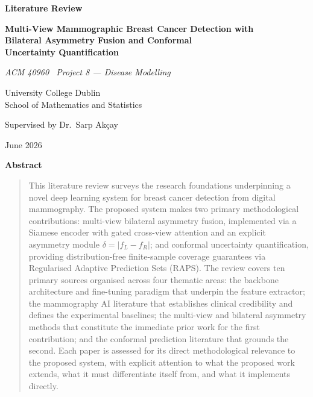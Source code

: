 \documentclass[12pt, a4paper]{article}
\renewenvironment{abstract}{%
  \begin{center}\textbf{Abstract}\end{center}%
  \begin{quotation}%
}{\end{quotation}}
\begin{document}
\begin{titlepage}
  \centering
  \vspace*{3cm}

  {\LARGE\bfseries Literature Review\par}
  \vspace{1.2cm}

  {\large\bfseries
    Multi-View Mammographic Breast Cancer Detection with\\
    Bilateral Asymmetry Fusion and Conformal\\
    Uncertainty Quantification\par}
  \vspace{1.8cm}

  {\normalsize\itshape ACM 40960 \textperiodcentered\ Project 8 --- Disease Modelling\par}
  \vspace{0.6cm}

  {\normalsize University College Dublin\\
  School of Mathematics and Statistics\par}
  \vspace{0.6cm}

  {\normalsize Supervised by Dr.\ Sarp Ak{\c{c}}ay\par}
  \vspace{0.6cm}

  {\normalsize June 2026\par}
\end{titlepage}

\begin{abstract}
This literature review surveys the research foundations underpinning a novel
deep learning system for breast cancer detection from digital mammography.
The proposed system makes two primary methodological contributions: multi-view
bilateral asymmetry fusion, implemented via a Siamese encoder with gated
cross-view attention and an explicit asymmetry module
$\delta = |f_L - f_R|$; and conformal uncertainty quantification, providing
distribution-free finite-sample coverage guarantees via Regularised Adaptive
Prediction Sets (RAPS).
The review covers ten primary sources organised across four thematic areas:
the backbone architecture and fine-tuning paradigm that underpin the feature
extractor; the mammography AI literature that establishes clinical credibility
and defines the experimental baselines; the multi-view and bilateral asymmetry
methods that constitute the immediate prior work for the first contribution;
and the conformal prediction literature that grounds the second.
Each paper is assessed for its direct methodological relevance to the proposed
system, with explicit attention to what the proposed work extends, what it
must differentiate itself from, and what it implements directly.
\end{abstract}
\end{document}
